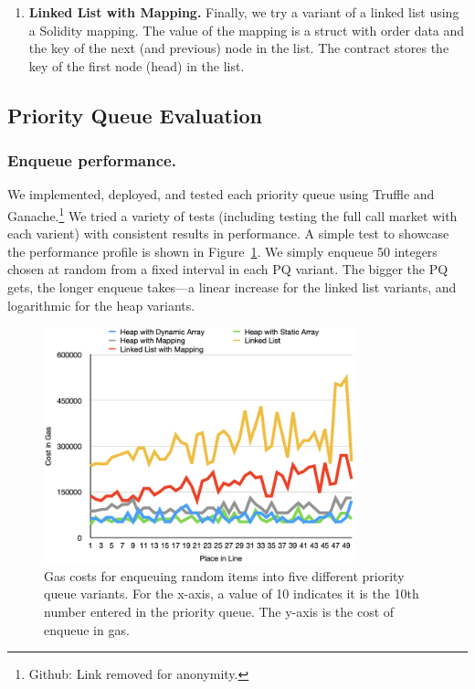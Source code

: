 \begin{enumerate}
\item \textbf{Linked List with Mapping.} Finally, we try a variant of a linked list using a Solidity mapping. The value of the mapping is a struct with order data and the key of the next (and previous) node in the list. The contract stores the key of the first node (head) in the list. 

\end{enumerate}


\subsection{Priority Queue Evaluation} 

\subsubsection{Enqueue performance.} We implemented, deployed, and tested each priority queue using Truffle and Ganache.\footnote{Github: Link removed for anonymity.} We tried a variety of tests (including testing the full call market with each varient) with consistent results in performance. A simple test to showcase the performance profile is shown in Figure~\ref{fig:random_insertion}. We simply enqueue 50 integers chosen at random from a fixed interval in each PQ variant. The bigger the PQ gets, the longer enqueue takes---a linear increase for the linked list variants, and logarithmic for the heap variants. 


\begin{figure}[t]
\centering
\includegraphics[width=0.8\textwidth]{fig/random_insertion.png}
\caption{\footnotesize{Gas costs for enqueuing random items into five different priority queue variants. For the x-axis, a value of 10 indicates it is the 10th number entered in the priority queue. The y-axis is the cost of enqueue in gas.}  \label{fig:random_insertion}}
\end{figure}

